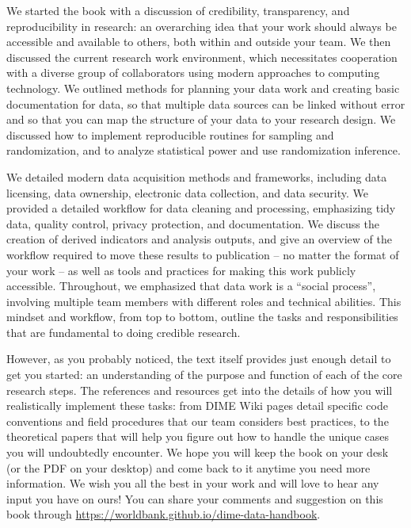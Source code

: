 \documentclass[
]{book}
\begin{document}
We started the book with a discussion of
credibility, transparency, and reproducibility in research:
an overarching idea that your work should always be
accessible and available to others, both within and outside your team.
We then discussed the current research work environment,
which necessitates cooperation with a diverse group of collaborators
using modern approaches to computing technology.
We outlined methods for planning your data work
and creating basic documentation for data,
so that multiple data sources can be linked without error
and so that you can map the structure of your data
to your research design.
We discussed how to implement reproducible routines for sampling and randomization,
and to analyze statistical power and use randomization inference.

We detailed modern data acquisition methods and frameworks,
including data licensing, data ownership,
electronic data collection, and data security.
We provided a detailed workflow for data cleaning and processing,
emphasizing tidy data, quality control, privacy protection, and documentation.
We discuss the creation of derived indicators and analysis outputs,
and give an overview of the workflow required to move these results
to publication -- no matter the format of your work --
as well as tools and practices for making this work publicly accessible.
Throughout, we emphasized that data work is a ``social process'',
involving multiple team members with different roles and technical abilities.
This mindset and workflow, from top to bottom,
outline the tasks and responsibilities
that are fundamental to doing credible research.

However, as you probably noticed, the text itself provides
just enough detail to get you started:
an understanding of the purpose and function of each of the core research steps.
The references and resources get into the details
of how you will realistically implement these tasks:
from DIME Wiki pages detail specific code conventions
and field procedures that our team considers best practices,
to the theoretical papers that will help you figure out
how to handle the unique cases you will undoubtedly encounter.
We hope you will keep the book on your desk
(or the PDF on your desktop)
and come back to it anytime you need more information.
We wish you all the best in your work
and will love to hear any input you have on ours!
You can share your comments and suggestion on this book through
\url{https://worldbank.github.io/dime-data-handbook}.
\end{document}
